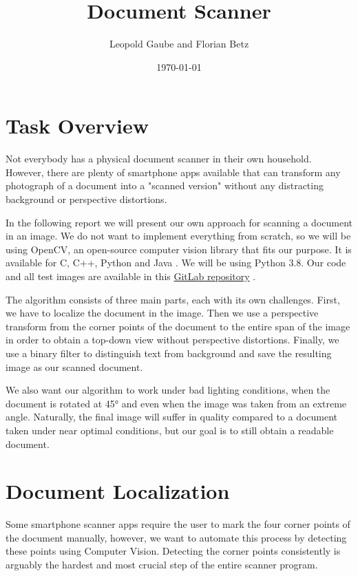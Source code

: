 \documentclass[bibliography=totoc]{scrartcl}
\title{Document Scanner}
\author{Leopold Gaube and Florian Betz}
\date{\today}
\begin{document}
\maketitle
\tableofcontents

\clearpage

\section{Task Overview}
Not everybody has a physical document scanner in their own household.
However, there are plenty of smartphone apps available that can transform any photograph of a document into a "scanned version" without any distracting background or perspective distortions.

In the following report we will present our own approach for scanning a document in an image.
We do not want to implement everything from scratch, so we will be using \acs{OpenCV}, an open-source computer vision library that fits our purpose.
It is available for C, C++, Python and Java \cite{OpenCV}.
We will be using Python 3.8. Our code and all test images are available in this \href{https://gitlab.com/gaubeleo/document-scanner}{GitLab repository} \cite{Gitlab}.

The algorithm consists of three main parts, each with its own challenges.
First, we have to localize the document in the image.
Then we use a perspective transform from the corner points of the document to the entire span of the image in order to obtain a top-down view without perspective distortions.
Finally, we use a binary filter to distinguish text from background and save the resulting image as our scanned document.

We also want our algorithm to work under bad lighting conditions, when the document is rotated at 45° and even when the image was taken from an extreme angle.
Naturally, the final image will suffer in quality compared to a document taken under near optimal conditions, but our goal is to still obtain a readable document.

\section{Document Localization}
Some smartphone scanner apps require the user to mark the four corner points of the document manually, however, we want to automate this process by detecting these points using Computer Vision.
Detecting the corner points consistently is arguably the hardest and most crucial step of the entire scanner program.
\end{document}
